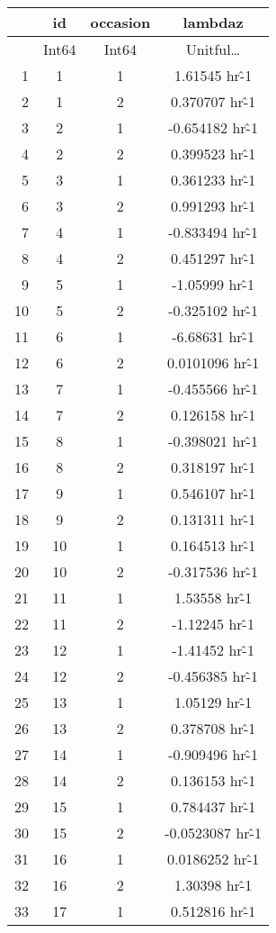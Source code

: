 \documentclass[12pt,a4paper]{article}
\begin{document}
\begin{tabular}{r|ccc}
	& id & occasion & lambdaz\\
	\hline
	& Int64 & Int64 & Unitful…\\
	\hline
	1 & 1 & 1 & 1.61545 hr\^-1 \\
	2 & 1 & 2 & 0.370707 hr\^-1 \\
	3 & 2 & 1 & -0.654182 hr\^-1 \\
	4 & 2 & 2 & 0.399523 hr\^-1 \\
	5 & 3 & 1 & 0.361233 hr\^-1 \\
	6 & 3 & 2 & 0.991293 hr\^-1 \\
	7 & 4 & 1 & -0.833494 hr\^-1 \\
	8 & 4 & 2 & 0.451297 hr\^-1 \\
	9 & 5 & 1 & -1.05999 hr\^-1 \\
	10 & 5 & 2 & -0.325102 hr\^-1 \\
	11 & 6 & 1 & -6.68631 hr\^-1 \\
	12 & 6 & 2 & 0.0101096 hr\^-1 \\
	13 & 7 & 1 & -0.455566 hr\^-1 \\
	14 & 7 & 2 & 0.126158 hr\^-1 \\
	15 & 8 & 1 & -0.398021 hr\^-1 \\
	16 & 8 & 2 & 0.318197 hr\^-1 \\
	17 & 9 & 1 & 0.546107 hr\^-1 \\
	18 & 9 & 2 & 0.131311 hr\^-1 \\
	19 & 10 & 1 & 0.164513 hr\^-1 \\
	20 & 10 & 2 & -0.317536 hr\^-1 \\
	21 & 11 & 1 & 1.53558 hr\^-1 \\
	22 & 11 & 2 & -1.12245 hr\^-1 \\
	23 & 12 & 1 & -1.41452 hr\^-1 \\
	24 & 12 & 2 & -0.456385 hr\^-1 \\
	25 & 13 & 1 & 1.05129 hr\^-1 \\
	26 & 13 & 2 & 0.378708 hr\^-1 \\
	27 & 14 & 1 & -0.909496 hr\^-1 \\
	28 & 14 & 2 & 0.136153 hr\^-1 \\
	29 & 15 & 1 & 0.784437 hr\^-1 \\
	30 & 15 & 2 & -0.0523087 hr\^-1 \\
	31 & 16 & 1 & 0.0186252 hr\^-1 \\
	32 & 16 & 2 & 1.30398 hr\^-1 \\
	33 & 17 & 1 & 0.512816 hr\^-1 \\

\end{tabular}
\end{document}
